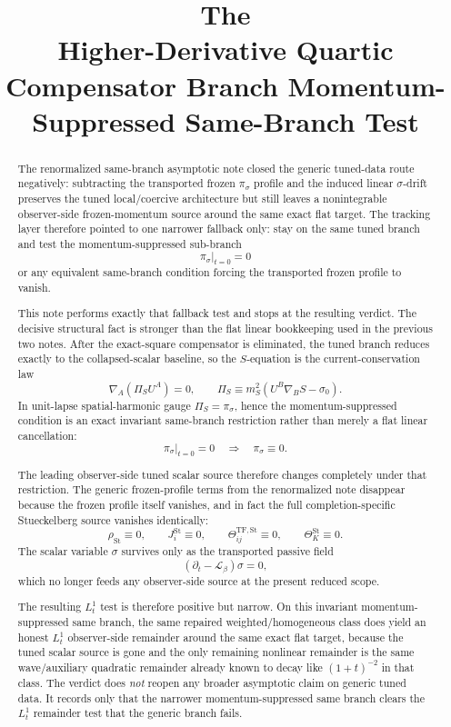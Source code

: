 \documentclass[11pt]{article}
\title{\textbf{The \TheoryName{}}\\[0.4em]
\large Higher-Derivative Quartic Compensator Branch Momentum-Suppressed Same-Branch Test}
\author{}
\date{}
\newcommand{\Ell}{\mathcal{L}}
\begin{document}
\maketitle

\begin{abstract}
The renormalized same-branch asymptotic note closed the generic tuned-data route negatively: subtracting the transported frozen \(\pi_\sigma\) profile and the induced linear \(\sigma\)-drift preserves the tuned local/coercive architecture but still leaves a nonintegrable observer-side frozen-momentum source around the same exact flat target. The tracking layer therefore pointed to one narrower fallback only: stay on the same tuned branch and test the momentum-suppressed sub-branch
\[
\pi_\sigma|_{t=0}=0
\]
or any equivalent same-branch condition forcing the transported frozen profile to vanish.

This note performs exactly that fallback test and stops at the resulting verdict. The decisive structural fact is stronger than the flat linear bookkeeping used in the previous two notes. After the exact-square compensator is eliminated, the tuned branch reduces exactly to the collapsed-scalar baseline, so the \(S\)-equation is the current-conservation law
\[
\nabla_A\!\left(\Pi_S U^A\right)=0,
\qquad
\Pi_S\equiv m_S^2(U^B\nabla_BS-\sigma_0).
\]
In unit-lapse spatial-harmonic gauge \(\Pi_S=\pi_\sigma\), hence the momentum-suppressed condition is an exact invariant same-branch restriction rather than merely a flat linear cancellation:
\[
\pi_\sigma|_{t=0}=0
\quad\Longrightarrow\quad
\pi_\sigma\equiv 0.
\]

The leading observer-side tuned scalar source therefore changes completely under that restriction. The generic frozen-profile terms from the renormalized note disappear because the frozen profile itself vanishes, and in fact the full completion-specific Stueckelberg source vanishes identically:
\[
\rho_{\mathrm{St}}\equiv 0,
\qquad
J_i^{\mathrm{St}}\equiv 0,
\qquad
\Theta_{ij}^{\mathrm{TF,St}}\equiv 0,
\qquad
\Theta_K^{\mathrm{St}}\equiv 0.
\]
The scalar variable \(\sigma\) survives only as the transported passive field
\[
(\partial_t-\Ell_\beta)\sigma=0,
\]
which no longer feeds any observer-side source at the present reduced scope.

The resulting \(L_t^1\) test is therefore positive but narrow. On this invariant momentum-suppressed same branch, the same repaired weighted/homogeneous class does yield an honest \(L_t^1\) observer-side remainder around the same exact flat target, because the tuned scalar source is gone and the only remaining nonlinear remainder is the same wave/auxiliary quadratic remainder already known to decay like \((1+t)^{-2}\) in that class. The verdict does \emph{not} reopen any broader asymptotic claim on generic tuned data. It records only that the narrower momentum-suppressed same branch clears the \(L_t^1\) remainder test that the generic branch fails.
\end{abstract}
\end{document}
